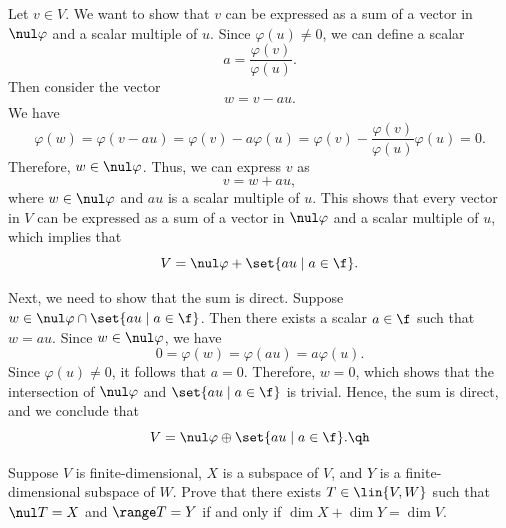\begin{sol}
    Let $v \in V$. We want to show that $v$ can be expressed as a sum of a vector in $\nul \varphi$ and a scalar multiple of $u$. Since $\varphi(u) \neq 0$, we can define a scalar
    \[a = \frac{\varphi(v)}{\varphi(u)}.\]
    Then consider the vector
    \[w = v - au.\]
    We have
    \[\varphi(w) = \varphi(v - au) = \varphi(v) - a\varphi(u) = \varphi(v) - \frac{\varphi(v)}{\varphi(u)}\varphi(u) = 0.\]
    Therefore, $w \in \nul \varphi$. Thus, we can express $v$ as
    \[v = w + au,\]
    where $w \in \nul \varphi$ and $au$ is a scalar multiple of $u$. This shows that every vector in $V$ can be expressed as a sum of a vector in $\nul \varphi$ and a scalar multiple of $u$, which implies that
    \[V = \nul \varphi + \set{au \mid a \in \f}.\]

    Next, we need to show that the sum is direct. Suppose $w \in \nul \varphi \cap \set{au \mid a \in \f}$. Then there exists a scalar $a \in \f$ such that $w = au$. Since $w \in \nul \varphi$, we have
    \[0 = \varphi(w) = \varphi(au) = a\varphi(u).\]
    Since $\varphi(u) \neq 0$, it follows that $a = 0$. Therefore, $w = 0$, which shows that the intersection of $\nul \varphi$ and $\set{au \mid a \in \f}$ is trivial. Hence, the sum is direct, and we conclude that
    \[V = \nul \varphi \oplus \set{au \mid a \in \f}. \qh\]
\end{sol}

\begin{exercise}[3b31]
    Suppose $V$ is finite-dimensional, $X$ is a subspace of $V$, and $Y$ is a finite-dimensional subspace of $W$. Prove that there exists $T \in \lin{V, W}$ such that $\nul T = X$ and $\range T = Y$ if and only if $\dim X + \dim Y = \dim V$.
\end{exercise}

